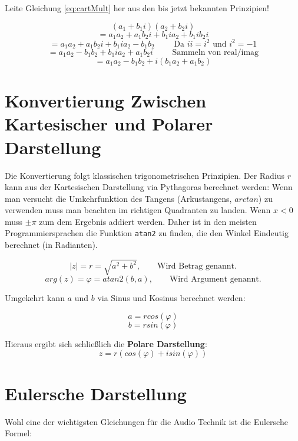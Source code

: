 \begin{question}
    Leite Gleichung \ref{eq:cartMult} her aus den bis jetzt bekannten Prinzipien! 
\end{question}

\begin{answer}
$$(a_1 + b_1i) (a_2 + b_2i)$$
$$ = a_1a_2 + a_1b_2i + b_1i a_2 +b_1i b_2i$$
$$ = a_1a_2 +  a_1b_2i +b_1i a_2 - b_1 b_2 \qquad\text{ Da } ii = i^2 \text{ und } i^2=-1$$
$$ = a_1a_2 - b_1 b_2 + b_1i a_2 + a_1b_2i  \qquad\text{ Sammeln von real/imag}$$
$$ = a_1a_2 - b_1 b_2 +  i (b_1 a_2 + a_1b_2)$$
\end{answer}


\section{Konvertierung Zwischen Kartesischer und Polarer Darstellung}
Die Konvertierung folgt klassischen trigonometrischen Prinzipien.
Der Radius $r$ kann aus der Kartesischen Darstellung via Pythagoras berechnet werden:
Wenn man versucht die Umkehrfunktion des Tangens (Arkustangens, $arctan$) zu verwenden muss man beachten im richtigen Quadranten zu landen. Wenn $x<0$ muss $\pm \pi$ zum dem Ergebnis addiert werden. Daher ist in den meisten Programmiersprachen die Funktion \texttt{atan2} zu finden, die den Winkel Eindeutig berechnet (in Radianten). 

$$|z| = r = \sqrt{a^2 + b^2}, \qquad \text{Wird Betrag genannt.}$$
$$ arg(z) = \varphi = atan2(b,a), \qquad \text{Wird Argument genannt.} $$



Umgekehrt kann $a$ und $b$ via Sinus und Kosinus berechnet werden:

$$a = r cos(\varphi)$$
$$b = r sin(\varphi)$$

Hieraus ergibt sich schließlich die \textbf{Polare Darstellung}:
$$ z = r (cos(\varphi) + i sin(\varphi))$$




\section{Eulersche Darstellung}


Wohl eine der wichtigsten Gleichungen für die Audio Technik ist die Eulersche Formel:

